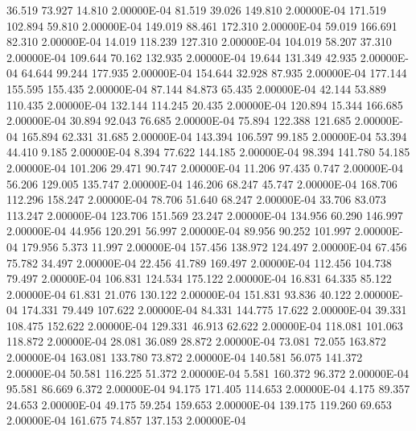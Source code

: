     36.519    73.927    14.810  2.00000E-04
    81.519    39.026   149.810  2.00000E-04
   171.519   102.894    59.810  2.00000E-04
   149.019    88.461   172.310  2.00000E-04
    59.019   166.691    82.310  2.00000E-04
    14.019   118.239   127.310  2.00000E-04
   104.019    58.207    37.310  2.00000E-04
   109.644    70.162   132.935  2.00000E-04
    19.644   131.349    42.935  2.00000E-04
    64.644    99.244   177.935  2.00000E-04
   154.644    32.928    87.935  2.00000E-04
   177.144   155.595   155.435  2.00000E-04
    87.144    84.873    65.435  2.00000E-04
    42.144    53.889   110.435  2.00000E-04
   132.144   114.245    20.435  2.00000E-04
   120.894    15.344   166.685  2.00000E-04
    30.894    92.043    76.685  2.00000E-04
    75.894   122.388   121.685  2.00000E-04
   165.894    62.331    31.685  2.00000E-04
   143.394   106.597    99.185  2.00000E-04
    53.394    44.410     9.185  2.00000E-04
     8.394    77.622   144.185  2.00000E-04
    98.394   141.780    54.185  2.00000E-04
   101.206    29.471    90.747  2.00000E-04
    11.206    97.435     0.747  2.00000E-04
    56.206   129.005   135.747  2.00000E-04
   146.206    68.247    45.747  2.00000E-04
   168.706   112.296   158.247  2.00000E-04
    78.706    51.640    68.247  2.00000E-04
    33.706    83.073   113.247  2.00000E-04
   123.706   151.569    23.247  2.00000E-04
   134.956    60.290   146.997  2.00000E-04
    44.956   120.291    56.997  2.00000E-04
    89.956    90.252   101.997  2.00000E-04
   179.956     5.373    11.997  2.00000E-04
   157.456   138.972   124.497  2.00000E-04
    67.456    75.782    34.497  2.00000E-04
    22.456    41.789   169.497  2.00000E-04
   112.456   104.738    79.497  2.00000E-04
   106.831   124.534   175.122  2.00000E-04
    16.831    64.335    85.122  2.00000E-04
    61.831    21.076   130.122  2.00000E-04
   151.831    93.836    40.122  2.00000E-04
   174.331    79.449   107.622  2.00000E-04
    84.331   144.775    17.622  2.00000E-04
    39.331   108.475   152.622  2.00000E-04
   129.331    46.913    62.622  2.00000E-04
   118.081   101.063   118.872  2.00000E-04
    28.081    36.089    28.872  2.00000E-04
    73.081    72.055   163.872  2.00000E-04
   163.081   133.780    73.872  2.00000E-04
   140.581    56.075   141.372  2.00000E-04
    50.581   116.225    51.372  2.00000E-04
     5.581   160.372    96.372  2.00000E-04
    95.581    86.669     6.372  2.00000E-04
    94.175   171.405   114.653  2.00000E-04
     4.175    89.357    24.653  2.00000E-04
    49.175    59.254   159.653  2.00000E-04
   139.175   119.260    69.653  2.00000E-04
   161.675    74.857   137.153  2.00000E-04
